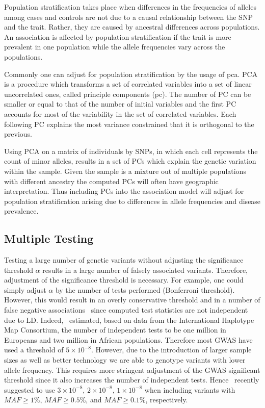 Population stratification takes place when differences in the frequencies of alleles among cases and controls are not due to a causal relationship between the SNP and the trait.
Rather, they are caused by ancestral differences across populations.
An association is affected by population stratification if the trait is more prevalent in one population while the allele frequencies vary across the populations.

Commonly one can adjust for population stratification by the usage of \acrfull{pca}.
PCA is a procedure which transforms a set of correlated variables into a set of linear uncorrelated ones, called principle components (\acrshort{pc}).
The number of PC can be smaller or equal to that of the number of initial variables and the first PC accounts for most of the variability in the set of correlated variables.
Each following PC explains the most variance constrained that it is orthogonal to the previous.

Using PCA on a matrix of individuals by SNPs, in which each cell represents the count of minor alleles, results in a set of PCs which explain the genetic variation within the sample.
Given the sample is a mixture out of multiple populations with different ancestry the computed PCs will often have geographic interpretation.
Thus including PCs into the association model will adjust for population stratification arising due to differences in allele frequencies and disease prevalence.

\subsection{Multiple Testing}
\label{ssec:multiple_testing}

Testing a large number of genetic variants without adjusting the significance threshold $\alpha$ results in a large number of falsely associated variants.
Therefore, adjustment of the significance threshold is necessary.
For example, one could simply adjust $\alpha$ by the number of tests performed (Bonferroni threshold).
However, this would result in an overly conservative threshold and in a number of false negative associations~\cite{Benjamini1995} since computed test statistics are not independent due to LD\@.
Indeed,~\citet{Peer2008} estimated, based on data from the International Haplotype Map Consortium, the number of independent tests to be one million in Europeans and two million in African populations.
Therefore most GWAS have used a threshold of $5\times 10^{-8}$.
However, due to the introduction of larger sample sizes as well as better technology we are able to genotype variants with lower allele frequency.
This requires more stringent adjustment of the GWAS significant threshold since it also increases the number of independent tests.
Hence~\citet{Fadista2016} recently suggested to use $3\times10^{-8}$, $2\times10^{-8}$, $1\times10^{-8}$ when including variants with $MAF\ge1\%$, $MAF\ge0.5\%$, and $MAF\ge0.1\%$, respectively.

